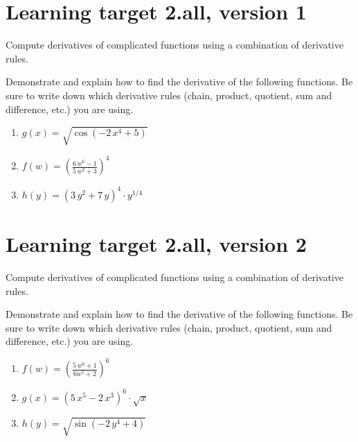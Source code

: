 
\usepackage{pgfplots}

\everymath{\displaystyle}


\section{Learning target 2.all, version 1}

Compute derivatives of complicated functions using a combination of derivative rules.

\hrulefill

Demonstrate and explain how to find the derivative of the following functions. Be sure to write down which derivative rules (chain, product, quotient, sum and difference, etc.) you are using.

\begin{enumerate}
    \item \(g(x) = \sqrt{\cos\left(-2 \, x^{4} + 5\right)}\)
    \vfill
    \item \(f(w) = \left( \frac{6 \, w^{6} - 1}{5 \, w^2 + 3} \right)^{ 4 }\)
    \vfill
    \item \(h(y) = {\left(3 \, y^{2} + 7 \, y\right)}^{4}\cdot y^{1/4}\)
    \vfill
\end{enumerate}



\pagebreak

\section{Learning target 2.all, version 2}

Compute derivatives of complicated functions using a combination of derivative rules.

\hrulefill

Demonstrate and explain how to find the derivative of the following functions. Be sure to write down which derivative rules (chain, product, quotient, sum and difference, etc.) you are using.

\begin{enumerate}
    \item \(f(w) = \left( \frac{5 \, w^{6} + 1}{6w^5 + 2} \right)^{ 6 }\)
    \vfill
    \item \(g(x) = {\left(5 \, x^{5} - 2 \, x^{3}\right)}^{6}\cdot  \sqrt{x}\)
    \vfill
    \item \(h(y) = \sqrt{\sin\left(-2 \, y^{4} + 4\right)}\)
    \vfill
\end{enumerate}

